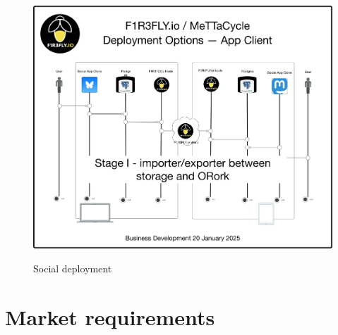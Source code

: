 \documentclass{article}
\begin{document}
\begin{figure}
  \centering
  \includegraphics[scale=0.15]{MeTTaCycleArchitecture2025SocialDeployment.pdf} \\
  \caption{Social deployment}
  \label{MCArch2025SocialDeployment}
\end{figure}

\section{Market requirements}
\end{document}

